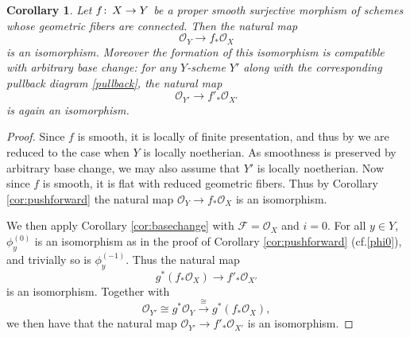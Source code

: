 \documentclass{gtpart}
\newtheorem{cor}[thm]{Corollary}
\theoremstyle{definition}
\theoremstyle{remark}
\def\co{\colon\thinspace}
\newcommand{\cf}{cf.\thinspace}
\newcommand{\CO}{{\mathscr{O}}}
\newcommand{\CF}{{\mathscr{F}}}
\newcommand{\f}{\phi}
\begin{document}
\begin{cor}
\label{cor:iso}
 Let $f \co X \to Y$ be a proper smooth surjective morphism of schemes whose geometric fibers are connected.  
 Then the natural map 
 \[
  \CO_Y \to f_* \CO_X 
 \]
 is an isomorphism.  Moreover the formation of this isomorphism is compatible with arbitrary base change: 
 for any $Y$-scheme $Y'$ along with the corresponding pullback diagram \eqref{pullback}, the natural map 
 \[
  \CO_{Y'} \to f'_* \CO_{X'} 
 \]
 is again an isomorphism.  
\end{cor}
\begin{proof}
 Since $f$ is smooth, it is locally of finite presentation, and thus by \cite[8.9.1 and 11.2.6.1]{EGAIV} we are reduced to the case when $Y$ is locally noetherian.  
 As smoothness is preserved by arbitrary base change, we may also assume that $Y'$ is locally noetherian.  
 Now since $f$ is smooth, it is flat with reduced geometric fibers.  
 Thus by Corollary \ref{cor:pushforward} the natural map $\CO_Y \to f_* \CO_X$ is an isomorphism.  

 We then apply Corollary \ref{cor:basechange} with $\CF = \CO_X$ and $i = 0$.  
 For all $y \in Y$, $\f_y^{(0)}$ is an isomorphism as in the proof of Corollary \ref{cor:pushforward} (\cf \eqref{phi0}), 
 and trivially so is $\f_y^{(-1)}$.  Thus the natural map 
 \[
  g^*(f_* \CO_X) \to f'_* \CO_{X'} 
 \]
 is an isomorphism.  Together with 
 \[
  \CO_{Y'} \cong g^* \CO_Y \stackrel{\cong}{\longrightarrow} g^*(f_* \CO_X), 
 \]
 we then have that the natural map $\CO_{Y'} \to f'_* \CO_{X'}$ is an isomorphism.  
\end{proof}


%
%
\end{document}
